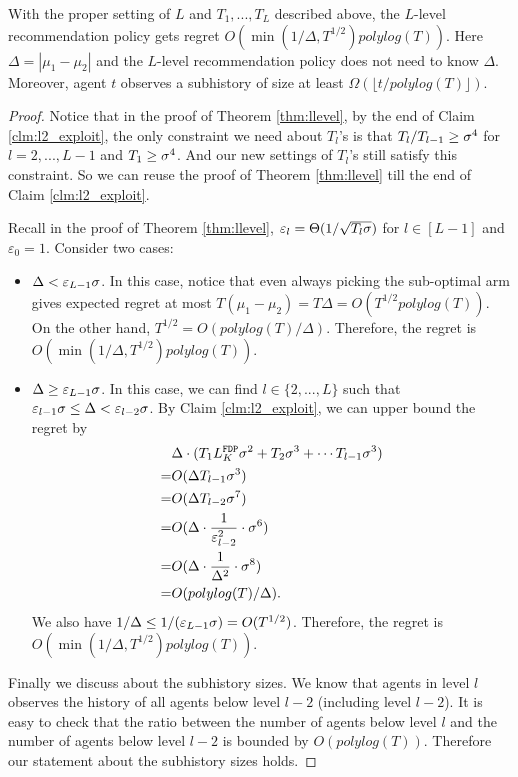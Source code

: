 \begin{corollary}
\label{cor:llevel}
With the proper setting of $L$ and $T_1,...,T_L$ described above, the $L$-level recommendation policy gets regret $O(\min(1/\Delta, T^{1/2})polylog(T))$. Here $\Delta = |\mu_1 -\mu_2|$ and the $L$-level recommendation policy does not need to know $\Delta$. Moreover, agent $t$ observes a subhistory of size at least $\Omega( \lfloor t/polylog(T)\rfloor)$. 
\end{corollary}

\begin{proof}
Notice that in the proof of Theorem \ref{thm:llevel}, by the end of Claim \ref{clm:l2_exploit}, the only constraint we need about $T_l$'s is that $T_l / T_{l-1} \geq \sigma^4$ for $l=2,...,L-1$ and $T_1 \geq \sigma^4$. And our new settings of $T_l$'s still satisfy this constraint. So we can reuse the proof of Theorem \ref{thm:llevel} till the end of Claim \ref{clm:l2_exploit}.

Recall in the proof of Theorem \ref{thm:llevel}, $\varepsilon_l =\Theta(1/\sqrt{T_l \sigma})$ for $l \in [L-1]$ and $\varepsilon_0 = 1$. Consider two cases:
\begin{itemize}
\item $\Delta < \varepsilon_{L-1} \sigma$. In this case, notice that even always picking the sub-optimal arm gives expected regret at most $T(\mu_1-\mu_2) = T\Delta = O(T^{1/2} polylog(T))$. On the other hand, $T^{1/2} = O(polylog(T)/\Delta)$. Therefore, the regret is $O(\min(1/\Delta, T^{1/2})polylog(T))$.
\item $\Delta \geq \varepsilon_{L-1} \sigma$. In this case, we can find $l \in \{2,...,L\}$ such that $\varepsilon_{l-1} \sigma\leq \Delta < \varepsilon_{l-2} \sigma$. By Claim \ref{clm:l2_exploit}, we can upper bound the regret by
\begin{align*}
&\Delta \cdot (T_1 L^\mathtt{FDP}_K \sigma^2  +T_2 \sigma^3+ \cdots T_{l-1} \sigma^3)\\
=& O(\Delta T_{l-1}\sigma^3) \\
=&O(\Delta T_{l-2}\sigma^7) \\
=&O(\Delta\cdot  \frac{1}{\varepsilon^2_{l-2}}\cdot \sigma^6)\\
=&O(\Delta \cdot \frac{1}{\Delta^2}\cdot \sigma^8)\\
=&O(polylog(T)/\Delta).
\end{align*}
We also have $1/\Delta \leq 1/(\varepsilon_{L-1}\sigma)= O(T^{1/2})$. Therefore, the regret is $O(\min(1/\Delta, T^{1/2})polylog(T))$.
\end{itemize}

Finally we discuss about the subhistory sizes. We know that agents in level $l$ observes the history of all agents below level $l-2$ (including level $l-2$). It is easy to check that the ratio between the number of agents below level $l$ and the number of agents below level $l-2$ is bounded by $O(polylog(T))$. Therefore our statement about the subhistory sizes holds.
\end{proof}

